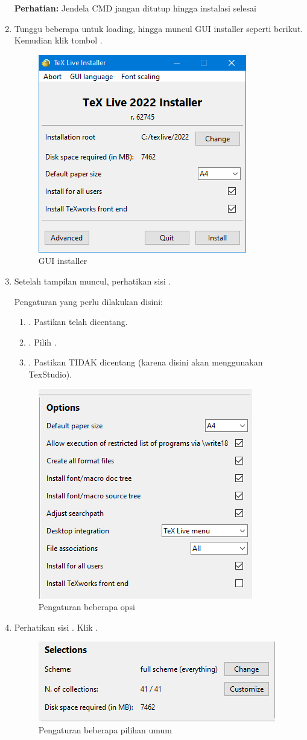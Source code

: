 \documentclass{book} %
\begin{document}
\begin{enumerate}
		\textbf{Perhatian:} Jendela CMD jangan ditutup hingga instalasi selesai

		\item Tunggu beberapa untuk loading, hingga muncul GUI installer seperti berikut.
		Kemudian klik tombol .

		\begin{figure}[!ht]
			\centering
			\includegraphics[width=0.3\linewidth]{images/texlivewin3}
			\caption{GUI installer}
		\end{figure}

		\item Setelah tampilan  muncul, perhatikan sisi .

		Pengaturan yang perlu dilakukan disini:
		\begin{enumerate}
			\item {}. Pastikan telah dicentang.
			\item {}. Pilih .
			\item {}. Pastikan TIDAK dicentang (karena disini akan menggunakan TexStudio).
		\end{enumerate}

		\begin{figure}[!ht]
			\centering
			\includegraphics[width=0.3\linewidth]{images/texlivewin4}
			\caption{Pengaturan beberapa opsi}
		\end{figure}

		\newpage
		\item Perhatikan sisi . Klik .

		\begin{figure}[!ht]
			\centering
			\includegraphics[width=0.3\linewidth]{images/texlivewin5}
			\caption{Pengaturan beberapa pilihan umum}
		\end{figure}


\end{enumerate}
\end{document}

